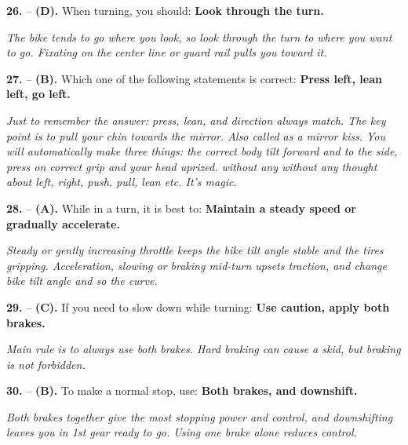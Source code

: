 \begin{minipage}{\linewidth}
\noindent\textbf{26.}  -- \textbf {(D).} When turning, you should:  \textbf {Look through the turn.} \par \textit {The bike tends to go where you look, so look through the turn to where you want to go. Fixating on the center line or guard rail pulls you toward it.} \\
\end{minipage}

\begin{minipage}{\linewidth}
\noindent\textbf{27.}  -- \textbf {(B).} Which one of the following statements is correct:  \textbf {Press left, lean left, go left.} \par \textit {Just to remember the answer: press, lean, and direction always match. The key point is to pull your chin towards the mirror. Also called as a mirror kiss. You will automatically make three things: the correct body tilt forward and to the side, press on correct grip and your head uprized. without any without any thought about left, right, push, pull, lean etc. It's magic.} \\
\end{minipage}

\begin{minipage}{\linewidth}
\noindent\textbf{28.}  -- \textbf {(A).} While in a turn, it is best to:  \textbf {Maintain a steady speed or gradually accelerate.} \par \textit {Steady or gently increasing throttle keeps the bike tilt angle stable and the tires gripping. Acceleration, slowing or braking mid-turn upsets traction, and change bike tilt angle and so the curve.} \\
\end{minipage}

\begin{minipage}{\linewidth}
\noindent\textbf{29.}  -- \textbf {(C).} If you need to slow down while turning:  \textbf {Use caution, apply both brakes.} \par \textit {Main rule is to always use both brakes. Hard braking can cause a skid, but braking is not forbidden.} \\
\end{minipage}

\begin{minipage}{\linewidth}
\noindent\textbf{30.}  -- \textbf {(B).} To make a normal stop, use:  \textbf {Both brakes, and downshift.} \par \textit {Both brakes together give the most stopping power and control, and downshifting leaves you in 1st gear ready to go. Using one brake alone reduces control.} \\
\end{minipage}

